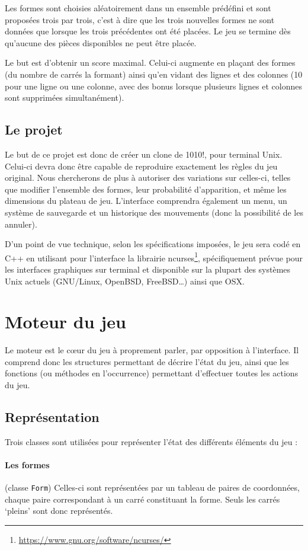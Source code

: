 \documentclass[11pt,a4paper]{article}
\begin{document}
Les formes sont choisies aléatoirement dans un ensemble prédéfini et sont proposées trois par trois, c'est à dire que les trois nouvelles formes ne sont données que lorsque les trois précédentes ont été placées. Le jeu se termine dès qu'aucune des pièces disponibles ne peut être placée.

Le but est d'obtenir un score maximal. Celui-ci augmente en plaçant des formes (du nombre de carrés la formant) ainsi qu'en vidant des lignes et des colonnes (10 pour une ligne ou une colonne, avec des bonus lorsque plusieurs lignes et colonnes sont supprimées simultanément).

\subsection*{Le projet}
Le but de ce projet est donc de créer un clone de 1010!, pour terminal Unix. Celui-ci devra donc être capable de reproduire exactement les règles du jeu original. Nous chercherons de plus à autoriser des variations sur celles-ci, telles que modifier l'ensemble des formes, leur probabilité d'apparition, et même les dimensions du plateau de jeu. L'interface comprendra également un menu, un système de sauvegarde et un historique des mouvements (donc la possibilité de les annuler).

D'un point de vue technique, selon les spécifications imposées, le jeu sera codé en C++ en utilisant pour l'interface la librairie ncurses\footnote{\url{https://www.gnu.org/software/ncurses/}}, spécifiquement prévue pour les interfaces graphiques sur terminal et disponible sur la plupart des systèmes Unix actuels (GNU/Linux, OpenBSD, FreeBSD\dots) ainsi que OSX.


\newpage
\section{Moteur du jeu}
Le moteur est le cœur du jeu à proprement parler, par opposition à l'interface. Il comprend donc les structures permettant de décrire l'état du jeu, ainsi que les fonctions (ou méthodes en l'occurrence) permettant d'effectuer toutes les actions du jeu.

\subsection{Représentation}
Trois classes sont utilisées pour représenter l'état des différents éléments du jeu :

\paragraph{Les formes} (classe \verb"Form")
Celles-ci sont représentées par un tableau de paires de coordonnées, chaque paire correspondant à un carré constituant la forme. Seuls les carrés `pleins' sont donc représentés. 
\end{document}

